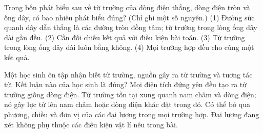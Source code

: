 \begin{ex}
Trong bốn phát biểu sau về từ trường của dòng điện thẳng, dòng điện tròn và ống dây, có bao nhiêu phát biểu đúng? (Chỉ ghi một số nguyên.) (1) Đường sức quanh dây dẫn thẳng là các đường tròn đồng tâm; từ trường trong lòng ống dây dài gần đều. (2) Cần đối chiếu kết quả với điều kiện bài toán. (3) Từ trường trong lòng ống dây dài luôn bằng không. (4) Mọi trường hợp đều cho cùng một kết quả.
\end{ex}

\begin{ex}
Một học sinh ôn tập nhận biết từ trường, nguồn gây ra từ trường và tương tác từ. Kết luận nào của học sinh là đúng?
\choice
{Mọi điện tích đứng yên đều tạo ra từ trường giống dòng điện.}
{\True Từ trường tồn tại xung quanh nam châm và dòng điện; nó gây lực từ lên nam châm hoặc dòng điện khác đặt trong đó.}
{Có thể bỏ qua phương, chiều và đơn vị của các đại lượng trong mọi trường hợp.}
{Đại lượng đang xét không phụ thuộc các điều kiện vật lí nêu trong bài.}
\end{ex}

